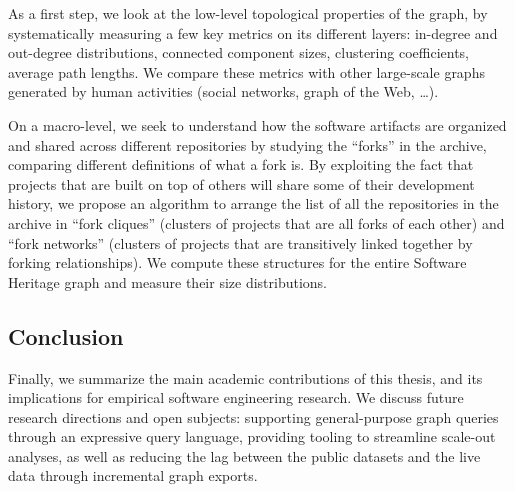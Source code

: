As a first step, we look at the low-level topological properties of the graph,
by systematically measuring a few key metrics on its different layers:
in-degree and out-degree distributions, connected component sizes, clustering
coefficients, average path lengths. We compare these metrics with other
large-scale graphs generated by human activities (social networks, graph of the
Web, …).

On a macro-level, we seek to understand how the software artifacts are
organized and shared across different repositories by studying the ``forks'' in
the archive, comparing different definitions of what a fork is. By exploiting
the fact that projects that are built on top of others will share some of their
development history, we propose an algorithm to arrange the list of all the
repositories in the archive in ``fork cliques'' (clusters of projects that are
all forks of each other) and ``fork networks'' (clusters of projects that are
transitively linked together by forking relationships). We compute these
structures for the entire Software Heritage graph and measure their size
distributions.

\subsection*{Conclusion}

Finally, we summarize the main academic contributions of this thesis, and its
implications for empirical software engineering research. We discuss future
research directions and open subjects: supporting general-purpose graph queries
through an expressive query language, providing tooling to streamline scale-out
analyses, as well as reducing the lag between the public datasets and the live
data through incremental graph exports.
